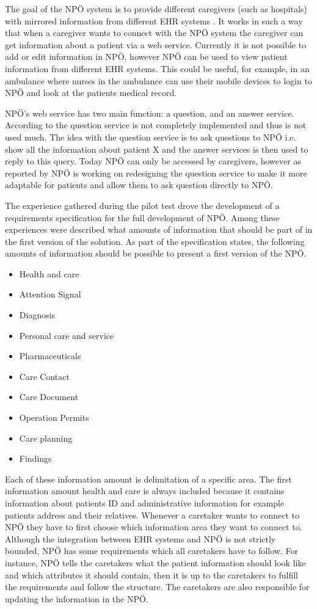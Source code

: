 \documentclass[14pt]{article}
\begin{document}
The goal of the NPÖ system is to provide different caregivers (such as hospitals) with mirrored information from different \gls{EHR} systems \cite{ViktorJernelov}. It works in such a way that when a caregiver wants to connect with the NPÖ system the caregiver can get information about a patient via a web service. Currently it is not possible to add or edit information in NPÖ, however NPÖ can be used to view patient information from different \gls{EHR} systems. This could be useful, for example, in an ambulance where nurses in the ambulance can use their mobile devices to login to NPÖ and look at the patients medical record.  

NPÖ's web service has two main function: a question, and an answer service. According to \cite{ViktorJernelov} the question service is not completely implemented and thus is not used much. The idea with the question service is to ask questions to NPÖ i.e. show all the information about patient X and the answer services is then used to reply to this query. Today NPÖ can only be accessed by caregivers, however as reported by \cite{ViktorJernelov} NPÖ is working on redesigning the question service to make it more adaptable for patients and allow them to ask question directly to NPÖ. 

The experience gathered during the pilot test drove the development of a requirements specification for the full development of NPÖ. Among these experiences were described what amounts of information that should be part of in the first version of the solution. As part of the specification states, the following amounts of information should be possible to present a first version of the NPÖ.
\begin{itemize}
\item Health and care
\item Attention Signal
\item Diagnosis
\item Personal care and service
\item Pharmaceuticals
\item Care Contact
\item Care Document
\item Operation Permits
\item Care planning
\item Findings
\end{itemize}
Each of these information amount is delimitation of a specific area. The first information amount health and care is always included because it contains information about patients ID and administrative information for example patients address and their relatives. Whenever a caretaker wants to connect to NPÖ they have to first choose which information area they want to connect to. Although the integration between \gls{EHR} systems and NPÖ is not strictly bounded, NPÖ has some requirements which all caretakers have to follow. For instance, NPÖ tells the caretakers what the patient information should look like and which attributes it should contain, then it is up to the caretakers to fulfill the requirements and follow the structure. The caretakers are also responsible for updating the information in the NPÖ. 
\end{document}
